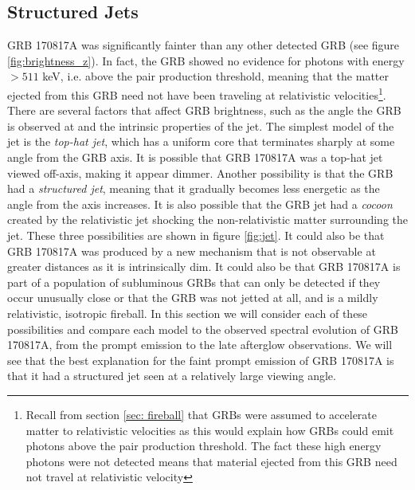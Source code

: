 \documentclass[11pt]{cuthesis}
\begin{document}
\subsection{Structured Jets} \label{sec:structured jets}
GRB 170817A was significantly fainter than any other detected GRB (see figure \ref{fig:brightness_z}). In fact, the GRB showed no evidence for photons with energy $>511$ keV, i.e. above the pair production threshold, meaning that the matter ejected from this GRB need not have been traveling at relativistic velocities\footnote{Recall from section \ref{sec: fireball} that GRBs were assumed to accelerate matter to relativistic velocities as this would explain how GRBs could emit photons above the pair production threshold. The fact these high energy photons were not detected means that material ejected from this GRB need not travel at relativistic velocity}. There are several factors that affect GRB brightness, such as the angle the GRB is observed at and the intrinsic properties of the jet. The simplest model of the jet is the \textit{top-hat jet}, which has a uniform core that terminates sharply at some angle from the GRB axis. It is possible that GRB 170817A was a top-hat jet viewed off-axis, making it appear dimmer. Another possibility is that the GRB had a \textit{structured jet}, meaning that it gradually becomes less energetic as the angle from the axis increases. It is also possible that the GRB jet had a \textit{cocoon} created by the relativistic jet shocking the non-relativistic matter surrounding the jet. These three possibilities are shown in figure \ref{fig:jet}. It could also be that GRB 170817A was produced by a new mechanism that is not observable at greater distances as it is intrinsically dim. It could also be that GRB 170817A is part of a population of subluminous GRBs that can only be detected if they occur unusually close or that the GRB was not jetted at all, and is a mildly relativistic, isotropic fireball. In this section we will consider each of these possibilities and compare each model to the observed spectral evolution of GRB 170817A, from the prompt emission to the late afterglow observations. We will see that the best explanation for the faint prompt emission of GRB 170817A is that it had a structured jet seen at a relatively large viewing angle. 
\end{document}
